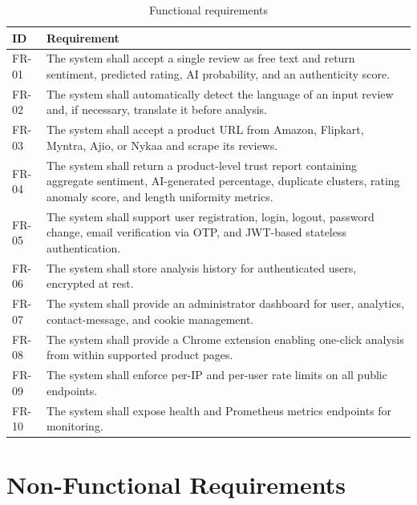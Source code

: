 \documentclass[12pt,a4paper,oneside]{report}
\begin{document}
\begin{table}[ht]
\centering
\caption{Functional requirements}
\label{tab:func_req}
\begin{tabularx}{\textwidth}{l X}
\toprule
\textbf{ID} & \textbf{Requirement} \\
\midrule
FR-01 & The system shall accept a single review as free text and return
        sentiment, predicted rating, AI probability, and an authenticity
        score. \\
FR-02 & The system shall automatically detect the language of an input
        review and, if necessary, translate it before analysis. \\
FR-03 & The system shall accept a product URL from Amazon, Flipkart,
        Myntra, Ajio, or Nykaa and scrape its reviews. \\
FR-04 & The system shall return a product-level trust report containing
        aggregate sentiment, AI-generated percentage, duplicate clusters,
        rating anomaly score, and length uniformity metrics. \\
FR-05 & The system shall support user registration, login, logout,
        password change, email verification via OTP, and JWT-based
        stateless authentication. \\
FR-06 & The system shall store analysis history for authenticated users,
        encrypted at rest. \\
FR-07 & The system shall provide an administrator dashboard for user,
        analytics, contact-message, and cookie management. \\
FR-08 & The system shall provide a Chrome extension enabling one-click
        analysis from within supported product pages. \\
FR-09 & The system shall enforce per-IP and per-user rate limits on all
        public endpoints. \\
FR-10 & The system shall expose health and Prometheus metrics endpoints
        for monitoring. \\
\bottomrule
\end{tabularx}
\end{table}

\section{Non-Functional Requirements}
\end{document}
